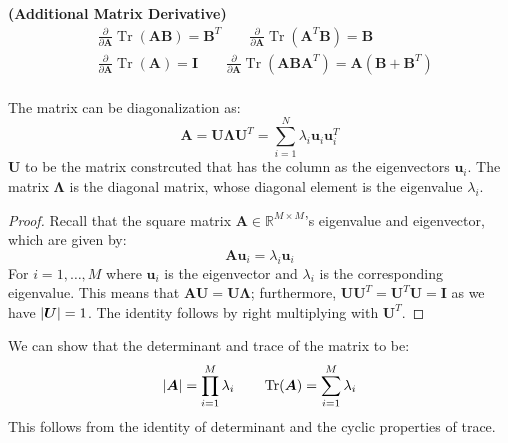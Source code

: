 \begin{remark}{\textbf{(Additional Matrix Derivative)}}
    \begin{equation*}
    \begin{aligned}
        &\frac{\partial}{\partial \boldsymbol A} \operatorname{Tr}(\boldsymbol A\boldsymbol B) = \boldsymbol B^T \qquad
        \frac{\partial}{\partial \boldsymbol A} \operatorname{Tr}(\boldsymbol A^T\boldsymbol B) = \boldsymbol B \\
        &\frac{\partial}{\partial \boldsymbol A} \operatorname{Tr}(\boldsymbol A) = \boldsymbol I \qquad
        \frac{\partial}{\partial \boldsymbol A} \operatorname{Tr}(\boldsymbol A\boldsymbol B\boldsymbol A^T) = \boldsymbol A(\boldsymbol B+\boldsymbol B^T) \\
    \end{aligned}
    \end{equation*}
\end{remark}

\begin{proposition}
    The matrix can be diagonalization as:
    \begin{equation*}
        \boldsymbol A = \boldsymbol U\boldsymbol \Lambda\boldsymbol U^T = \sum^N_{i=1}\lambda_i\boldsymbol u_i\boldsymbol u_i^T
    \end{equation*}
    $\boldsymbol U$ to be the matrix constrcuted that has the column as the eigenvectors $\boldsymbol u_i$. The matrix $\boldsymbol \Lambda$ is the diagonal matrix, whose diagonal element is the eigenvalue $\lambda_i$.
\end{proposition}
\begin{proof}
    Recall that the square matrix $\boldsymbol A\in \mathbb{R}^{M\times M}$'s eigenvalue and eigenvector, which are given by:
    \begin{equation*}
        \boldsymbol A \boldsymbol u_i = \lambda_i\boldsymbol u_i 
    \end{equation*}
    For $i=1,\dots,M$ where $\boldsymbol u_i$ is the eigenvector and $\lambda_i$ is the corresponding eigenvalue. This means that $\boldsymbol A\boldsymbol U = \boldsymbol U\boldsymbol \Lambda$; furthermore, $\boldsymbol U\boldsymbol U^T = \boldsymbol U^T\boldsymbol U = \boldsymbol I$ as we have $\left| \boldsymbol U \right| = 1$. The identity follows by right multiplying with $\boldsymbol U^T$.
\end{proof}

\begin{proposition}
    We can show that the determinant and trace of the matrix to be:
    \begin{equation*}
        \left| \boldsymbol A \right| = \prod^M_{i=1} \lambda_i \qquad \operatorname{Tr}(\boldsymbol A) = \sum^M_{i=1}\lambda_i
    \end{equation*}
    This follows from the identity of determinant and the cyclic properties of trace. 
\end{proposition}

